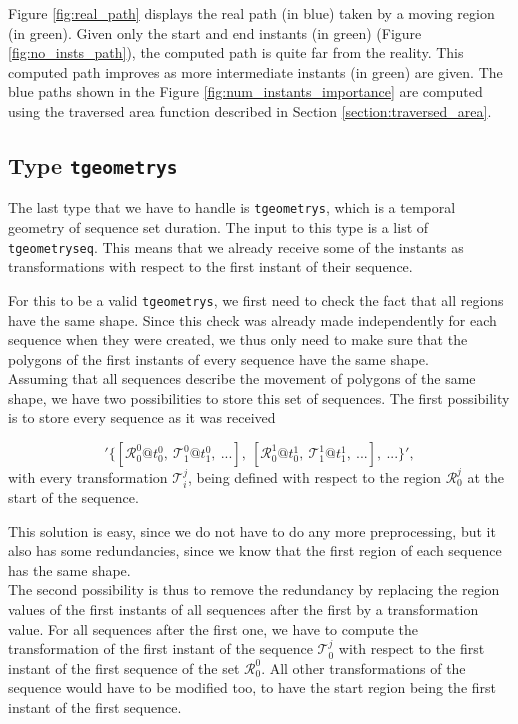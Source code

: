 Figure \ref{fig:real_path} displays the real path (in blue) taken by a moving region (in green). Given only the start and end instants (in green) (Figure \ref{fig:no_insts_path}), the computed path is quite far from the reality. This computed path improves as more intermediate instants (in green) are given. The blue paths shown in the Figure \ref{fig:num_instants_importance} are computed using the traversed area function described in Section \ref{section:traversed_area}.

\subsection{Type \texttt{tgeometrys}}
\label{section:internal_repr_s}

The last type that we have to handle is \lstinline{tgeometrys}, which is a temporal geometry of sequence set duration. The input to this type is a list of \lstinline{tgeometryseq}. This means that we already receive some of the instants as transformations with respect to the first instant of their sequence.

For this to be a valid \lstinline{tgeometrys}, we first need to check the fact that all regions have the same shape. Since this check was already made independently for each sequence when they were created, we thus only need to make sure that the polygons of the first instants of every sequence have the same shape. \\

Assuming that all sequences describe the movement of  polygons of the same shape, we have two possibilities to store this set of sequences. The first possibility is to store every sequence as it was received

\[
    '\{[\mathcal{R}_0^0@t_0^0,\ \mathcal{T}_1^0@t_1^0,\ ...],\ [\mathcal{R}_0^1@t_0^1,\ \mathcal{T}_1^1@t_1^1,\ ...],\ ...\}', 
\]
with every transformation $\mathcal{T}_i^j$, being defined with respect to the region $\mathcal{R}_0^j$ at the start of the sequence.

This solution is easy, since we do not have to do any more preprocessing, but it also has some redundancies, since we know that the first region of each sequence has the same shape. \\

The second possibility is thus to remove the redundancy by replacing the region values of the first instants of all sequences after the first by a transformation value. For all sequences after the first one, we have to compute the transformation of the first instant of the sequence $\mathcal{T}_0^j$ with respect to the first instant of the first sequence of the set $\mathcal{R}_0^0$. All other transformations of the sequence would have to be modified too, to have the start region being the first instant of the first sequence.

